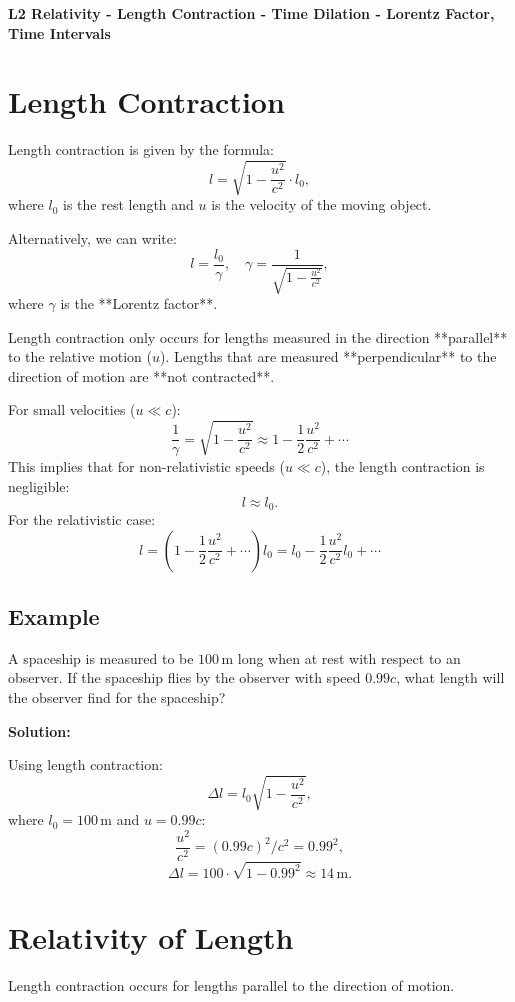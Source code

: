 \documentclass[a4paper,12pt]{article}
\begin{document}
\begin{center}
    \textbf{\large L2 Relativity - Length Contraction - Time Dilation - Lorentz Factor, Time Intervals}
\end{center}

\vspace{0.2cm}
\begin{multicols}{2}

\section*{Length Contraction}
Length contraction is given by the formula:
\[
l = \sqrt{1 - \frac{u^2}{c^2}} \cdot l_0,
\]
where \( l_0 \) is the rest length and \( u \) is the velocity of the moving object.

Alternatively, we can write:
\[
l = \frac{l_0}{\gamma}, \quad \gamma = \frac{1}{\sqrt{1 - \frac{u^2}{c^2}}},
\]
where \( \gamma \) is the **Lorentz factor**.

Length contraction only occurs for lengths measured in the direction **parallel** to the relative motion (\(u\)). Lengths that are measured **perpendicular** to the direction of motion are **not contracted**.

For small velocities (\(u \ll c\)):
\[
\frac{1}{\gamma} = \sqrt{1 - \frac{u^2}{c^2}} \approx 1 - \frac{1}{2}\frac{u^2}{c^2} + \cdots
\]
This implies that for non-relativistic speeds (\(u \ll c\)), the length contraction is negligible:
\[
l \approx l_0.
\]
For the relativistic case:
\[
l = \left( 1 - \frac{1}{2} \frac{u^2}{c^2} + \cdots \right) l_0 = l_0 - \frac{1}{2} \frac{u^2}{c^2} l_0 + \cdots
\]

\subsection*{Example}
A spaceship is measured to be \( 100 \, \text{m} \) long when at rest with respect to an observer. If the spaceship flies by the observer with speed \( 0.99c \), what length will the observer find for the spaceship?

\textbf{Solution:}

Using length contraction:
\[
\Delta l = l_0 \sqrt{1 - \frac{u^2}{c^2}},
\]
where \( l_0 = 100 \, \text{m} \) and \( u = 0.99c \):
\[
\frac{u^2}{c^2} = \left( 0.99c \right)^2 / c^2 = 0.99^2,
\]
\[
\Delta l = 100 \cdot \sqrt{1 - 0.99^2} \approx 14 \, \text{m}.
\]

\section*{Relativity of Length}
Length contraction occurs for lengths parallel to the direction of motion.


\end{multicols}
\end{document}
